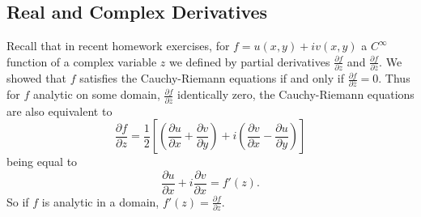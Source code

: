 \documentclass[12pt]{article}
\theoremstyle{definition}
\theoremstyle{remark}
\begin{document}
\subsection{Real and Complex Derivatives}
Recall that in recent homework exercises, for $f = u(x,y) + i v(x,y)$ a $C^{\infty}$ function of a complex variable $z$ we defined by partial derivatives $\frac{\partial f}{\partial z}$ and $\frac{\partial f}{\partial \overline{z}}$. We showed that $f$ satisfies the Cauchy-Riemann equations if and only if $\frac{\partial f}{\partial \overline{z}} = 0$. Thus for $f$ analytic on some domain, $\frac{\partial f}{\partial \overline{z}}$ identically zero, the Cauchy-Riemann equations are also equivalent to 
\begin{equation}
    \frac{\partial f}{\partial z} = \frac{1}{2} \left[ \left( \frac{\partial u}{\partial x} + \frac{\partial v}{\partial y} \right) + i \left( \frac{\partial v}{\partial x} - \frac{\partial u}{\partial y} \right) \right]
\end{equation}
being equal to 
\begin{equation}
    \frac{\partial u}{\partial x} + i \frac{\partial v}{\partial x} = f'(z).
\end{equation}
So if $f$ is analytic in a domain, $f'(z) = \frac{\partial f}{\partial z}$.
\end{document}
